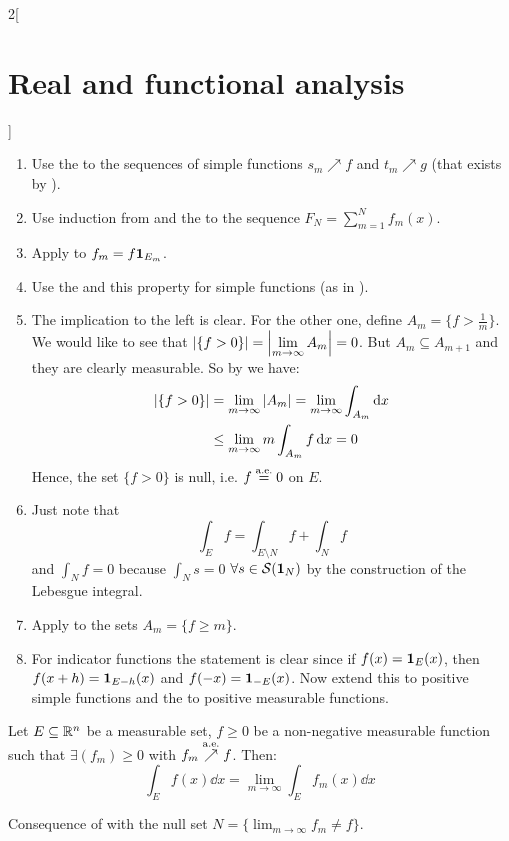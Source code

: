\documentclass[../../../main_math.tex]{subfiles}
\begin{document}
\begin{multicols}{2}[\section{Real and functional analysis}]
\begin{sproof}
    \begin{enumerate}
      \item Use the  to the sequences of simple functions $s_m\nearrow f$ and $t_m\nearrow g$ (that exists by ).
      \item Use induction from  and the  to the sequence $F_N=\sum_{m=1}^N f_m(x)$.
      \item Apply  to $f_m=f\boldsymbol{\mathrm{1}}_{E_m}$.
      \item Use the  and this property for simple functions (as in ).
      \item The implication to the left is clear. For the other one, define $A_m=\{f>\frac{1}{m}\}$. We would like to see that $\displaystyle\m{\{f>0\}}=\m{\lim_{m\to\infty}A_m}=0$. But $A_{m}\subseteq A_{m+1}$ and they are clearly measurable. So by  we have:
            \begin{align*}
              \displaystyle\m{\{f>0\}} & =\lim_{m\to\infty} \m{A_m}=\lim_{m\to\infty} \int_{A_m}\dd{x} \\
                                       & \leq\lim_{m\to\infty} m\int_{A_m}f\dd{x}=0
            \end{align*}
            Hence, the set $\{f>0\}$ is null, i.e. $f\overset{\text{a.e.}}{=}0$ on $E$.
      \item Just note that $$\int_Ef=\int_{E\setminus N} f+\int_N f$$ and $\int_Nf=0$ because $\int_Ns=0$ $\forall s\in\mathcal{S}(\boldsymbol{\mathrm{1}}_{N})$ by the construction of the Lebesgue integral.
      \item Apply  to the sets $A_m=\{f\geq m\}$.
      \item For indicator functions the statement is clear since if $f(x)=\boldsymbol{\mathrm{1}}_{E}(x)$, then $f(x+h)=\boldsymbol{\mathrm{1}}_{E-h}(x)$ and $f(-x)=\boldsymbol{\mathrm{1}}_{-E}(x)$. Now extend this to positive simple functions and the to positive measurable functions.
    \end{enumerate}
  \end{sproof}
  \begin{corollary}
    Let $E\subseteq\mathbb{R}^n$ be a measurable set, $f\geq 0$ be a non-negative measurable function such that $\exists (f_m)\geq 0$ with $f_m\overset{\text{a.e.}}{\nearrow} f$. Then: $$\int_Ef(x)\dd{x}=\lim_{m\to\infty}\int_Ef_m(x)\dd{x}$$
  \end{corollary}
  \begin{sproof}
    Consequence of  with the null set $N=\{\displaystyle\lim_{m\to\infty} f_m\ne f\}$.

\end{sproof}
\end{multicols}
\end{document}

